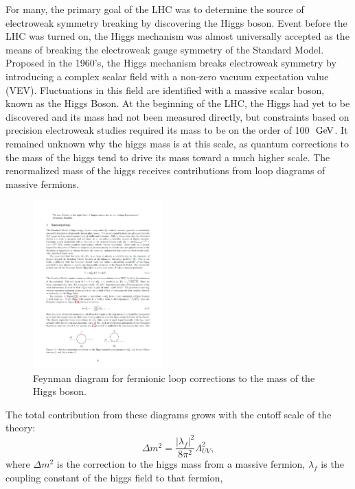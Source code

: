For many, the primary goal of the LHC was to determine the source of electroweak symmetry breaking by discovering the Higgs boson.
Event before the LHC was turned on, the Higgs mechanism was almost universally accepted
as the means of breaking the electroweak gauge symmetry of the Standard Model.
Proposed in the 1960's, the Higgs mechanism breaks electroweak symmetry by introducing a complex scalar field with a non-zero vacuum expectation value (VEV).
Fluctuations in this field are identified with a massive scalar boson, known as the Higgs Boson.
At the beginning of the LHC, the Higgs had yet to be discovered and its mass had not been measured directly,
but constraints based on precision electroweak studies required its mass to be on the order of 100 $\GeV$.
It remained unknown why the higgs mass is at this scale, as quantum corrections to the mass of the higgs
tend to drive its mass toward a much higher scale. %
The renormalized mass of the higgs receives contributions from loop diagrams of massive fermions.
\begin{figure}
  \begin{center}
    \includegraphics[width=50mm]{figures/theory/HiggsMassCorrection}
  \end{center}
  \caption{Feynman diagram for fermionic loop corrections to the mass of the Higgs boson.}
  \label{img:HiggsMassCorrection}
\end{figure}
The total contribution from these diagrams grows with the cutoff scale of the theory:
\begin{equation}
  \Delta m^{2} = \frac{|\lambda_f|^2}{8\pi^2}\Lambda_{UV}^2 ,
\end{equation}
where $\Delta m^{2}$ is the correction to the higgs mass from a massive fermion, $\lambda_f$ is the coupling constant of the higgs field to that fermion,
